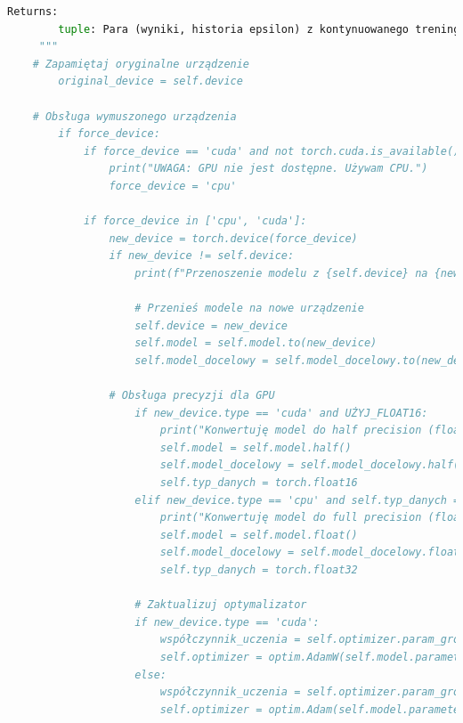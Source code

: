 \documentclass[a4paper,12pt]{article}
\begin{document}
\begin{lstlisting}[language=Python]
        Returns:
        tuple: Para (wyniki, historia epsilon) z kontynuowanego treningu
     """
    # Zapamiętaj oryginalne urządzenie
        original_device = self.device
    
    # Obsługa wymuszonego urządzenia
        if force_device:
            if force_device == 'cuda' and not torch.cuda.is_available():
                print("UWAGA: GPU nie jest dostępne. Używam CPU.")
                force_device = 'cpu'
        
            if force_device in ['cpu', 'cuda']:
                new_device = torch.device(force_device)
                if new_device != self.device:
                    print(f"Przenoszenie modelu z {self.device} na {new_device}...")
                
                    # Przenieś modele na nowe urządzenie
                    self.device = new_device
                    self.model = self.model.to(new_device)
                    self.model_docelowy = self.model_docelowy.to(new_device)
                
                # Obsługa precyzji dla GPU
                    if new_device.type == 'cuda' and UŻYJ_FLOAT16:
                        print("Konwertuję model do half precision (float16)...")
                        self.model = self.model.half()
                        self.model_docelowy = self.model_docelowy.half()
                        self.typ_danych = torch.float16
                    elif new_device.type == 'cpu' and self.typ_danych == torch.float16:
                        print("Konwertuję model do full precision (float32)...")
                        self.model = self.model.float()
                        self.model_docelowy = self.model_docelowy.float()
                        self.typ_danych = torch.float32
                    
                    # Zaktualizuj optymalizator
                    if new_device.type == 'cuda':
                        współczynnik_uczenia = self.optimizer.param_groups[0]['lr']
                        self.optimizer = optim.AdamW(self.model.parameters(), współczynnik_uczenia=współczynnik_uczenia, weight_decay=1e-5)
                    else:
                        współczynnik_uczenia = self.optimizer.param_groups[0]['lr']
                        self.optimizer = optim.Adam(self.model.parameters(), współczynnik_uczenia=współczynnik_uczenia)
    

\end{lstlisting}
\end{document}
